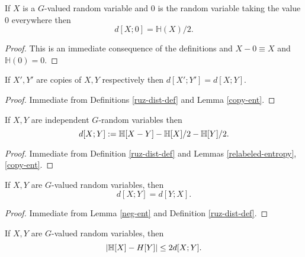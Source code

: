 \begin{lemma}\label{dist-zero}
  \leanok
If $X$ is a $G$-valued random variable and $0$ is the random variable taking the value $0$ everywhere then
\[d[X;0]=\mathbb{H}(X)/2.\]
\end{lemma}

\begin{proof}
This is an immediate consequence of the definitions and $X-0\equiv X$ and $\mathbb{H}(0)=0$.
\end{proof}

\begin{lemma}\label{ruz-copy}
  \leanok
  If $X',Y'$ are copies of $X,Y$ respectively then $d[X';Y']=d[X ;Y]$.
\end{lemma}

\begin{proof} \leanok Immediate from Definitions \ref{ruz-dist-def} and Lemma \ref{copy-ent}.
\end{proof}

\begin{lemma}\label{ruz-indep}
  \leanok
  If $X,Y$ are independent $G$-random variables then
  $$ d[X ;Y] := \mathbb{H}[X - Y] - \mathbb{H}[X]/2 - \mathbb{H}[Y]/2.$$
\end{lemma}

\begin{proof} \leanok Immediate from Definition \ref{ruz-dist-def} and Lemmas \ref{relabeled-entropy}, \ref{copy-ent}.
\end{proof}

\begin{lemma}\label{ruzsa-symm}
  \leanok
  If $X,Y$ are $G$-valued random variables, then
  $$ d[X ;Y] = d[Y;X].$$
\end{lemma}

\begin{proof} \leanok Immediate from Lemma \ref{neg-ent} and Definition \ref{ruz-dist-def}.
\end{proof}

\begin{lemma}\label{ruzsa-diff}
  \leanok
  If $X,Y$ are $G$-valued random variables, then
$$|\mathbb{H}[X]-H[Y]| \leq 2 d[X ;Y].$$
\end{lemma}

